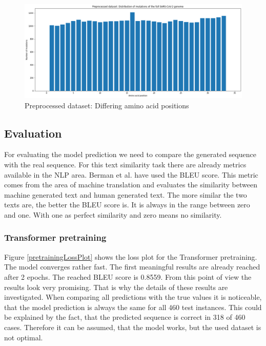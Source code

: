 \begin{figure}[ht]
	\centering
	\includegraphics[width=1.0\linewidth]{figures/preprocessedMutatedGeneticLoci.png}
	\caption{Preprocessed dataset: Differing amino acid positions \cite{own representation}}
	\label{preprocessedMutatedGeneticLoci}
\end{figure}

\newpage
\subsection{Evaluation}  \label{ch:experimentsB}

For evaluating the model prediction we need to compare the generated se\-quence with the real sequence. For this text similarity task there are already metrics available in the \ac{NLP} area. Berman et al. \cite{Berman2020} have used the \ac{BLEU} score. This metric comes from the area of machine translation and evaluates the similarity between machine generated text and human generated text. The more similar the two texts are, the better the \ac{BLEU} score is. It is always in the range between zero and one. With one as perfect similarity and zero means no similarity.

\subsubsection{Transformer pretraining}  \label{ch:experimentsBa}

Figure \ref{pretrainingLossPlot} shows the loss plot for the Transformer pretraining. The model converges rather fast. The first meaningful results are already reached after 2 epochs. The reached BLEU score is 0.8559. From this point of view the results look very promising. That is why the details of these results are investigated. When comparing all predictions with the true values it is noticeable, that the model prediction is always the same for all 460 test instances. This could be explained by the fact, that the predicted sequence is correct in 318 of 460 cases. Therefore it can be assumed, that the model works, but the used dataset is not optimal.

